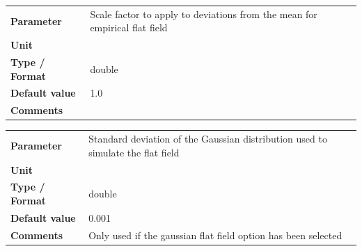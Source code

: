 \documentclass[11pt]{article}      %
\def\HCode#1{}
\def\htmlanchor#1{\HCode{<a id="#1"></a>}}
\begin{document}
\begin{table}[hb]
  \htmlanchor{flatFieldScaleFactor}
  \begin{tabular}{| l | p{13cm} |}
    \hline 
    {\bf Parameter} & Scale factor to apply to deviations from the mean for empirical flat field\\
    {\bf Unit} & \\
    {\bf Type / Format} & double\\
    {\bf Default value} & 1.0\\
    {\bf Comments} & \\
    \hline
  \end{tabular}
  \bigskip

  \htmlanchor{flatFieldSigma}
  \begin{tabular}{| l | p{13cm} |}
    \hline 
    {\bf Parameter} & Standard deviation of the Gaussian distribution used to simulate the flat field\\
    {\bf Unit} & \\
    {\bf Type / Format} & double\\
    {\bf Default value} & 0.001\\
    {\bf Comments} & Only used if the gaussian flat field option has been selected\\
    \hline
  \end{tabular}
  \bigskip

  \label{tab:flatField1}
\end{table}
\end{document}
